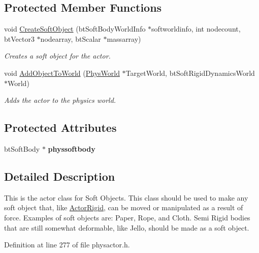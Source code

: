 \subsection*{Protected Member Functions}
\begin{DoxyCompactItemize}
\item 
void \hyperlink{classActorSoft_a01a570c728d6cb96d1a40003d6b17e22}{CreateSoftObject} (btSoftBodyWorldInfo $\ast$softworldinfo, int nodecount, btVector3 $\ast$nodearray, btScalar $\ast$massarray)
\begin{DoxyCompactList}\small\item\em Creates a soft object for the actor. \item\end{DoxyCompactList}\item 
void \hyperlink{classActorSoft_a0def29f28ed4d126a0634ddc97e33e2f}{AddObjectToWorld} (\hyperlink{classPhysWorld}{PhysWorld} $\ast$TargetWorld, btSoftRigidDynamicsWorld $\ast$World)
\begin{DoxyCompactList}\small\item\em Adds the actor to the physics world. \item\end{DoxyCompactList}\end{DoxyCompactItemize}
\subsection*{Protected Attributes}
\begin{DoxyCompactItemize}
\item 
\hypertarget{classActorSoft_aa7d4efd5150008eecc54e070be075700}{
btSoftBody $\ast$ {\bfseries physsoftbody}}
\label{d5/da4/classActorSoft_aa7d4efd5150008eecc54e070be075700}

\end{DoxyCompactItemize}


\subsection{Detailed Description}
This is the actor class for Soft Objects. This class should be used to make any soft object that, like \hyperlink{classActorRigid}{ActorRigid}, can be moved or manipulated as a result of force. Examples of soft objects are: Paper, Rope, and Cloth. Semi Rigid bodies that are still somewhat deformable, like Jello, should be made as a soft object. 

Definition at line 277 of file physactor.h.



